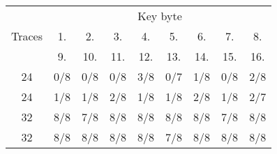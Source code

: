\begin{tabular}{| c | c | c | c | c | c | c | c | c |}
	\hline
	\multirow{3}{*}{Traces} & \multicolumn{8}{c|}{Key byte} \\
	\cline{2-9}
	~  &  1. &  2. &  3. &  4. &  5. &  6. &  7. &  8. \\
	\cline{2-9}
	~  &  9. & 10. & 11. & 12. & 13. & 14. & 15. & 16. \\
	\hline
	\hline
	24 & 0/8 & 0/8 & 0/8 & 3/8 & 0/7 & 1/8 & 0/8 & 2/8 \\
	\hline
	24 & 1/8 & 1/8 & 2/8 & 1/8 & 1/8 & 2/8 & 1/8 & 2/7 \\
	\hline
	\hline
	32 & 8/8 & 7/8 & 8/8 & 8/8 & 8/8 & 8/8 & 7/8 & 8/8 \\
	\hline
	32 & 8/8 & 8/8 & 8/8 & 8/8 & 7/8 & 8/8 & 8/8 & 8/8 \\
	\hline
\end{tabular}
